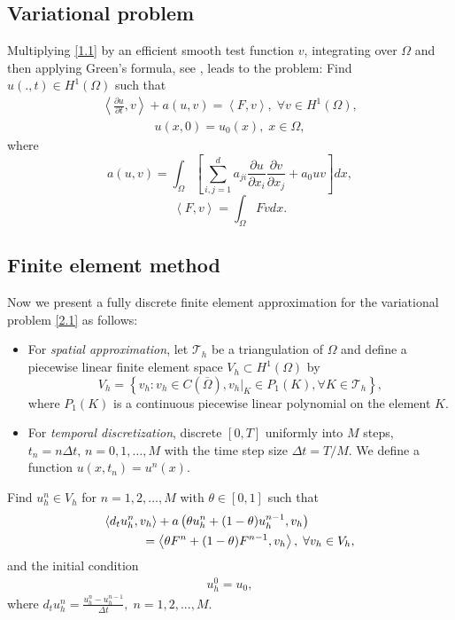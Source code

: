 \documentclass[twocolumn]{article}
\begin{document}
\subsection{Variational problem}
\quad Multiplying \eqref{1.1} by an efficient smooth test function $v$, integrating over $\Omega$ and then applying Green's formula, see \cite{}, leads to the problem: Find $u(.,t)\in H^1(\Omega)$ such that
\begin{align}\label{2.1}
	\left\langle \frac{\partial u}{\partial t}, v \right\rangle+a\left(u, v\right)=\left\langle F, v \right\rangle,\; \forall v\in H^1(\Omega),
\end{align} 
\begin{align}\label{2.2}
	u(x, 0)=u_0(x), \; x\in \Omega,
\end{align}
where 
$$a\left(u, v\right)=\int_{\Omega}\left[\sum_{i, j=1}^{d}a_{ji}\frac{\partial u}{\partial x_i}\frac{\partial v}{\partial x_j}+a_0uv\right]dx,$$
$$\left\langle F, v \right\rangle=\int_{\Omega}F vdx.$$

\subsection{Finite element method}
\quad Now we present a fully discrete finite element approximation for the variational problem \eqref{2.1} as follows:
\begin{itemize}
	\item For \textit{spatial approximation}, let $\mathcal{T}_h$ be a triangulation of $\Omega$ and define a piecewise linear finite element space $V_h \subset H^1(\Omega)$ by
	$$V_h=\left\{v_h:v_h\in C(\overline{\Omega}), v_h|_K\in P_1(K), \forall K\in \mathcal{T}_h\right\},$$
	where $P_1(K)$ is a continuous piecewise linear polynomial on the element $K$.
	\item For \textit{temporal discretization}, discrete $[0, T]$ uniformly into $M$ steps, $t_n=n\Delta t,\, n=0, 1, \dots, M$ with the time step size $\Delta t = T/M$. We define a function $u(x, t_n)=u^n(x)$.
\end{itemize}

Find $u^n_h\in V_h$ for $n=1, 2, \dots, M$ with $\theta \in [0, 1]$ such that
\begin{align}\label{2.3}
	&\langle d_tu^n_h, v_h \rangle+a\left(\theta u^n_h+(1-\theta)u^{n-1}_h, v_h\right)\notag\\
	&\qquad\quad=\left\langle \theta F^n+(1-\theta)F^{n-1}, v_h \right\rangle, \; \forall v_h\in V_h,
\end{align}
and the initial condition 
\begin{align}\label{2.4}
	u^0_h=u_0,
\end{align}
where $d_tu^n_h=\frac{u^n_h-u^{n-1}_h}{\Delta t}, \; n=1, 2, ..., M$.
\end{document}
